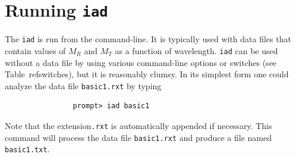 \documentclass{article}
\newcommand\iadprog{\texttt{iad}}
\begin{document}
\clearpage
\section{Running \iadprog{}}

The \iadprog{} is run from the command-line.  It is typically used with
data files that contain values of $M_R$ and $M_T$ as a function of wavelength.
\iadprog{} can be used without a data file by using various command-line 
options or switches (see Table~ref{switches}), but it is reasonably clumsy.  
In its simplest form 
one could analyze the data file \texttt{basic1.rxt} by typing
\begin{verbatim}
                prompt> iad basic1
\end{verbatim}
Note that the extension\texttt{.rxt} is automatically appended if necessary.
This command will process the data file \texttt{basic1.rxt} and produce a
file named \texttt{basic1.txt}.

\clearpage
\end{document}
